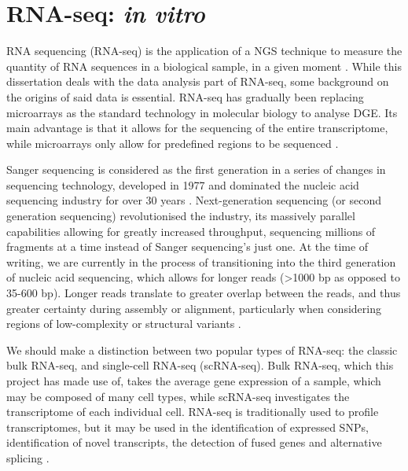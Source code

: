 

\section{RNA-seq: \textit{in vitro}}
RNA sequencing (RNA-seq) is the application of a \ac{NGS} technique to measure the quantity of RNA sequences in a biological sample, in a given moment \citep{zhong2009}. While this dissertation deals with the data analysis part of RNA-seq, some background on the origins of said data is essential. RNA-seq has gradually been replacing microarrays as the standard technology in molecular biology to analyse \ac{DGE}. Its main advantage is that it allows for the sequencing of the entire transcriptome, while microarrays only allow for predefined regions to be sequenced \citep{rao2019comparison}. 

Sanger sequencing is considered as the first generation in a series of changes in sequencing technology, developed in 1977 and dominated the nucleic acid sequencing industry for over 30 years \citep{behjati2013next}. Next-generation sequencing (or second generation sequencing) revolutionised the industry, its massively parallel capabilities allowing for greatly increased throughput, sequencing millions of fragments at a time instead of Sanger sequencing's just one. At the time of writing, we are currently in the process of transitioning into the third generation of nucleic acid sequencing, which allows for longer reads (>1000 bp as opposed to 35-600 bp). Longer reads translate to greater overlap between the reads, and thus greater certainty during assembly or alignment, particularly when considering regions of low-complexity or structural variants \citep{rhoads2015pacbio}. 

We should make a distinction between two popular types of RNA-seq: the classic bulk RNA-seq, and single-cell RNA-seq (scRNA-seq). Bulk RNA-seq, which this project has made use of, takes the average gene expression of a sample, which may be composed of many cell types, while scRNA-seq investigates the transcriptome of each individual cell. RNA-seq is traditionally used to profile transcriptomes, but it may be used in the identification of expressed SNPs, identification of novel transcripts, the detection of fused genes and alternative splicing \citep{han2015alternative, zhao2014comparison}. 



